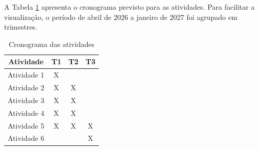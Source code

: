 A Tabela \ref{tab:cronograma} apresenta o cronograma previsto para as atividades. Para facilitar a visualização, o período de abril de 2026 a janeiro de 2027 foi agrupado em trimestres.

\begin{table}[h]
	\centering
	\caption{Cronograma das atividades}
	\begin{tabular}{cccc}
		\hline
		\textbf{Atividade} & \textbf{T1} & \textbf{T2} & \textbf{T3} \\
		\hline
		Atividade 1 & X &  &  \\
		\hline
		Atividade 2 & X & X &  \\
		\hline
		Atividade 3 & X & X &  \\
		\hline
		Atividade 4 & X & X &  \\
		\hline
		Atividade 5 & X & X & X \\
		\hline
		Atividade 6 &  &  & X \\
		\hline
	\end{tabular}
	\label{tab:cronograma}
\end{table}
